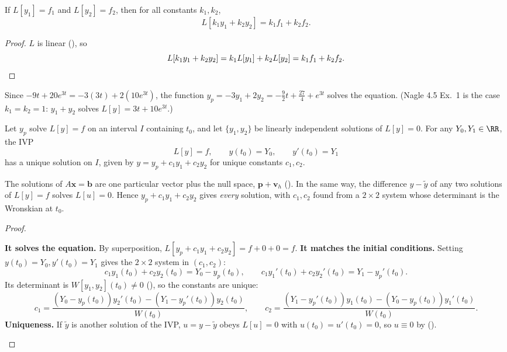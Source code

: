 \documentclass[10pt]{scrartcl}
\newcommand{\vv}[1]{\mathbf{#1}}
\begin{document}
\begin{theorem*}
  If $L[y_1]=f_1$ and $L[y_2]=f_2$, then for all constants $k_1,k_2$,
  \[
    L[k_1y_1+k_2y_2] = k_1f_1 + k_2f_2.
  \]
\end{theorem*}
\begin{proof}
  $L$ is linear (), so
  \[
    L[k_1y_1+k_2y_2]=k_1L[y_1]+k_2L[y_2]=k_1f_1+k_2f_2. \qedhere
  \]
\end{proof}

\revisit[ (part 1)] Since $-9t+20e^{3t}=-3(3t)+2(10e^{3t})$, the function $y_p=-3y_1+2y_2=-\frac92 t+\frac{27}{4}+e^{3t}$ solves the equation. (Nagle 4.5 Ex.~1 is the case $k_1=k_2=1$: $y_1+y_2$ solves $L[y]=3t+10e^{3t}$.)

\begin{theorem*}
  Let $y_p$ solve $L[y]=f$ on an interval $I$ containing $t_0$, and let $\{y_1,y_2\}$ be linearly independent solutions of $L[y]=0$. For any $Y_0,Y_1\in\RR$, the IVP
  \[
    L[y]=f,\qquad y(t_0)=Y_0,\qquad y'(t_0)=Y_1
  \]
  has a unique solution on $I$, given by $y=y_p+c_1y_1+c_2y_2$ for unique constants $c_1,c_2$.
\end{theorem*}
\begin{ideabox}
  The solutions of $A\vv x=\vv b$ are one particular vector plus the null space, $\vv p+\vv v_h$ (). In the same way, the difference $y-\tilde y$ of any two solutions of $L[y]=f$ solves $L[u]=0$. Hence $y_p+c_1y_1+c_2y_2$ gives \emph{every} solution, with $c_1,c_2$ found from a $2\times 2$ system whose determinant is the Wronskian at $t_0$.
\end{ideabox}
\begin{proof}
  \begin{steps}
    \ii \textbf{It solves the equation.} By superposition, $L[y_p+c_1y_1+c_2y_2]=f+0+0=f$.
    \ii \textbf{It matches the initial conditions.} Setting $y(t_0)=Y_0, y'(t_0)=Y_1$ gives the $2\times 2$ system in $(c_1,c_2)$:
    \[
      c_1y_1(t_0)+c_2y_2(t_0) = Y_0-y_p(t_0),\qquad
      c_1y_1'(t_0)+c_2y_2'(t_0) = Y_1-y_p'(t_0).
    \]
    Its determinant is $W[y_1,y_2](t_0)\neq 0$ (), so the constants are unique:
    \[
      c_1 = \frac{(Y_0-y_p(t_0))y_2'(t_0)-(Y_1-y_p'(t_0))y_2(t_0)}{W(t_0)},\qquad
      c_2 = \frac{(Y_1-y_p'(t_0))y_1(t_0)-(Y_0-y_p(t_0))y_1'(t_0)}{W(t_0)}.
    \]
    \ii \textbf{Uniqueness.} If $\tilde y$ is another solution of the IVP, $u=y-\tilde y$ obeys $L[u]=0$ with $u(t_0)=u'(t_0)=0$, so $u\equiv 0$ by  (). \qedhere
  \end{steps}
\end{proof}
\end{document}
